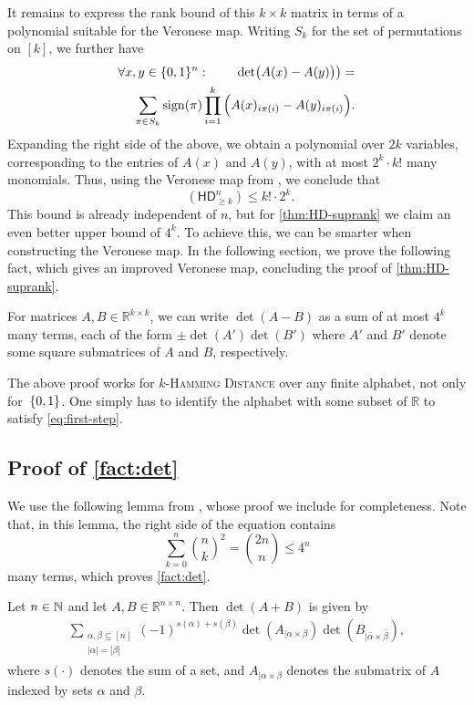 \documentclass[conference]{IEEEtran}
\DeclareMathOperator{\suprank}{rank_0}
\newcommand{\HD}[1]{\mathsf{HD}_{#1}}
\newcommand{\R}{\mathbb{R}}
\begin{document}
It remains to express the rank bound of this $k\times k$ matrix in terms of a polynomial suitable for the Veronese map. Writing $S_k$ for the set of permutations on $[k]$, we further have
\begin{align*}
\forall x,y\in \{0,1\}^n\,\colon\qquad \det\!\big(A(x)-A(y)\big)\big) =\\
\sum_{\pi\in S_k}\operatorname{sign}(\pi)\prod_{i = 1}^k \Big(A(x)_{i\pi(i)}-A(y)_{i\pi(i)}\Big).
\end{align*}
Expanding the right side of the above, we obtain a polynomial over $2k$ variables, corresponding to the entries of $A(x)$ and $A(y)$, with at most $2^k\cdot k!$ many monomials. Thus, using the Veronese map from , we conclude that
\[
\suprank(\HD{\geq k}^n) \leq k!\cdot 2^k.
\]
This bound is already independent of $n$, but for \cref{thm:HD-suprank} we claim an even better upper bound of $4^k$. To achieve this, we can be smarter when constructing the Veronese map. In the following section, we prove the following fact, which gives an improved Veronese map, concluding the proof of \cref{thm:HD-suprank}.

\begin{proposition}\label{fact:det}
    For matrices $A,B\in \R^{k\times k}$, we can write $\det(A-B)$ as a sum of at most $4^k$ many terms, each of the form $\pm \det(A')\det(B')$ where $A'$ and $B'$ denote some square submatrices of $A$ and $B$, respectively.
\end{proposition}

\begin{remark}
\label{remark:large-alphabet}
The above proof works for \textsc{$k$-Hamming Distance} over any finite alphabet, not only for~$\{0,1\}$. One simply has to identify the alphabet with some subset of $\R$ to satisfy \cref{eq:first-step}.
\end{remark}

\subsection{Proof of \texorpdfstring{\cref{fact:det}}{Proposition}}\label{sec:improving-bound}

We use the following lemma from \cite{Mar90}, whose proof we include for completeness. Note that, in this lemma, the right side of the equation contains
$$\sum_{k = 0}^n\binom{n}{k}^2 = \binom{2n}{n}\leq 4^n$$
many terms, which proves \cref{fact:det}.

\begin{lemma}\label{lemma:det-of-sum}
	Let $n\in\mathbb{N}$ and let $A,B\in \R^{n\times n}$. Then $\det(A+B)$ is given by
	\begin{align*}
    \sum_{\substack{\alpha,\beta \subseteq [n]\\[1mm] |\alpha| = |\beta|}} (-1)^{s(\alpha)+s(\beta)}\det(A_{|\alpha\times \beta})\det(B_{|\bar\alpha\times \bar\beta}),
	\end{align*}
	where $s(\cdot)$ denotes the sum of a set, and $A_{|\alpha \times \beta}$ denotes the submatrix of $A$ indexed by sets $\alpha$ and $\beta$.
\end{lemma}
\end{document}
